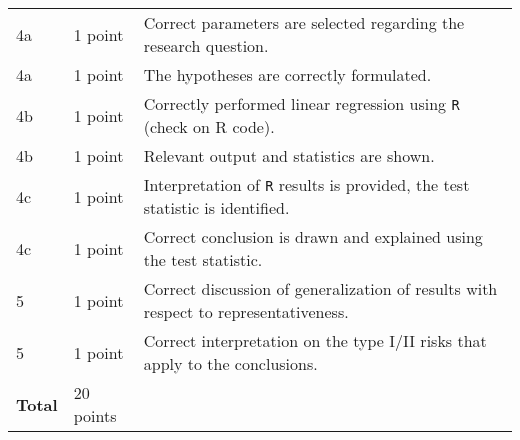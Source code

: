 \begin{center}
\begin{tabularx}{\textwidth}{l|l|>{\raggedright\arraybackslash}X}
     4a & 1 point & Correct parameters are selected regarding the research question. \\
     4a & 1 point & The hypotheses are correctly formulated. \\
     4b & 1 point & Correctly performed linear regression using \texttt{R} (check on R code). \\
     4b & 1 point & Relevant output and statistics are shown. \\
     4c & 1 point & Interpretation of \texttt{R} results is provided, the test statistic is identified. \\
     4c & 1 point & Correct conclusion is drawn and explained using the test statistic. \\
     5 & 1 point & Correct discussion of generalization of results with respect to representativeness. \\
     5 & 1 point & Correct interpretation on the type I/II risks that apply to the conclusions. \\
     \hline
     \textbf{Total} & 20 points & \\
\end{tabularx}
\end{center}

\normalfont

\clearpage %